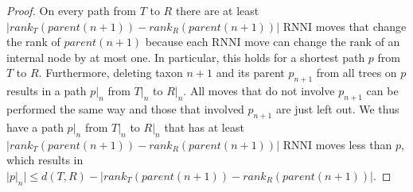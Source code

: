 \documentclass{amsart}
\newcommand{\nni}{\mathrm{NNI}}
\newcommand{\rnni}{\mathrm{RNNI}}
\begin{document}
\begin{proof}
    On every path from $T$ to $R$ there are at least $|rank_T(parent(n+1)) - rank_R(parent(n+1))|$ $\rnni$ moves that change the rank of $parent(n+1)$ because each $\rnni$ move can change the rank of an internal node by at most one.
    In particular, this holds for a shortest path $p$ from $T$ to $R$.
    Furthermore, deleting taxon $n+1$ and its parent $p_{n+1}$ from all trees on $p$ results in a path $p|_n$ from $T|_n$ to $R|_n$.
    All moves that do not involve $p_{n+1}$ can be performed the same way and those that involved $p_{n+1}$ are just left out.
    We thus have a path $p|_n$ from $T|_n$ to $R|_n$ that has at least $|rank_T(parent(n+1)) - rank_R(parent(n+1))|$ $\rnni$ moves less than $p$, which results in $|p|_n| \leq d(T,R) - |rank_T(parent(n+1)) - rank_R(parent(n+1))|$.
\end{proof}
\end{document}
